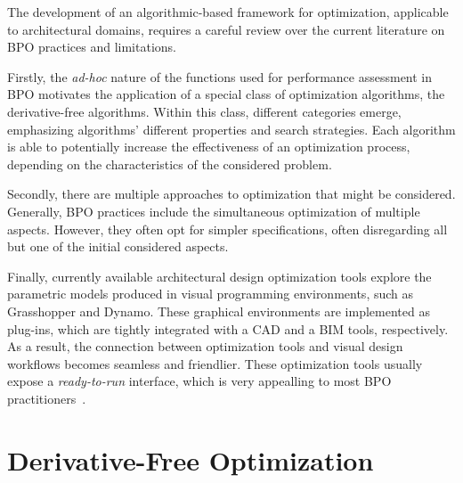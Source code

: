 \cleardoublepage
\label{chap:back}

	The development of an algorithmic-based framework for optimization, applicable to architectural domains, requires a careful review over the current literature on \ac{BPO} practices and limitations. 
	
	Firstly, the \textit{ad-hoc} nature of the functions used for performance assessment in \ac{BPO} motivates the application of a special class of optimization algorithms, the derivative-free algorithms. Within this class, different categories emerge, emphasizing algorithms' different properties and search strategies. Each algorithm is able to potentially increase the effectiveness of an optimization process, depending on the characteristics of the considered problem. 
	
	Secondly, there are multiple approaches to optimization that might be considered. Generally, \ac{BPO} practices include the simultaneous optimization of multiple aspects. However, they often opt for simpler  specifications, often disregarding all but one of the initial considered aspects. 

	Finally, currently available architectural design optimization tools explore the parametric models produced in visual programming environments, such as Grasshopper and Dynamo. These graphical environments are implemented as plug-ins, which are tightly integrated with a \ac{CAD} and a \ac{BIM} tools, respectively. As a result, the connection between optimization tools and visual design workflows becomes seamless and friendlier. These optimization tools usually expose a \textit{ready-to-run} interface, which is very appealling to most \ac{BPO} practitioners~\cite{Cichocka2017SURVEY}.
	
\section{Derivative-Free Optimization}

